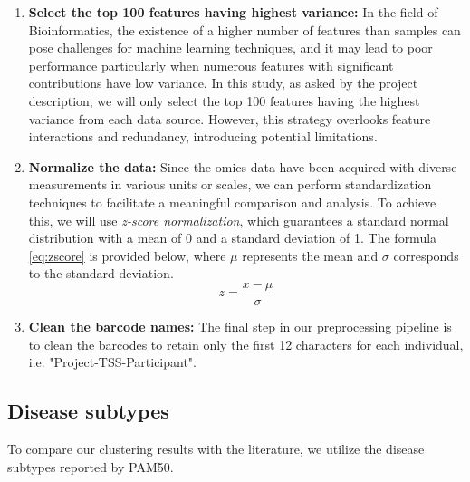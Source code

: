\begin{enumerate}[\IEEEsetlabelwidth{12)}]
    \item \textbf{Select the top 100 features having highest variance:} In the field of Bioinformatics, the existence of a higher number of features than samples can pose challenges for machine learning techniques, and it may lead to poor performance particularly when numerous features with significant contributions have low variance. In this study, as asked by the project description, we will only select the top 100 features having the highest variance from each data source. However, this strategy overlooks feature interactions and redundancy, introducing potential limitations.
    
    \item \textbf{Normalize the data:} Since the omics data have been acquired with diverse measurements in various units or scales, we can perform standardization techniques to facilitate a meaningful comparison and analysis. To achieve this, we will use \textit{z-score normalization}, which guarantees a standard normal distribution with a mean of 0 and a standard deviation of 1. The formula \eqref{eq:zscore} is provided below, where $\mu$ represents the mean and $\sigma$ corresponds to the standard deviation.
    \begin{equation}
        \label{eq:zscore}
        z = \frac{{x - \mu}}{{\sigma}}
    \end{equation}

    \item \textbf{Clean the barcode names:} The final step in our preprocessing pipeline is to clean the barcodes to retain only the first 12 characters for each individual, i.e. "Project-TSS-Participant".
\end{enumerate}


\subsection{Disease subtypes}

To compare our clustering results with the literature, we utilize the disease subtypes reported by PAM50\cite{PAM}. 

